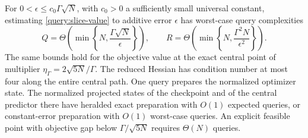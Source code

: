 \begin{theorem}\label{query:precision}
For $0<\epsilon\leq c_0\Gamma\sqrt N$, with $c_0>0$ a sufficiently
small universal constant, estimating \eqref{query:slice-value} to additive
error $\epsilon$ has worst-case query complexities
\begin{equation}\label{query:precision-law}
 Q=\Theta\!\left(\min\left\{N,\frac{\Gamma\sqrt N}{\epsilon}\right\}\right),
 \qquad
 R=\Theta\!\left(\min\left\{N,\frac{\Gamma^2N}{\epsilon^2}\right\}\right).
\end{equation}
The same bounds hold for the objective value at the exact central point
of multiplier $\eta_\Gamma=2\sqrt{5N}/\Gamma$. The reduced Hessian has
condition number at most four along the entire central path. One query
prepares the normalized optimizer state. The normalized projected states
of the checkpoint and of the central predictor there have heralded exact
preparation with $O(1)$ expected queries, or constant-error preparation
with $O(1)$ worst-case queries. An explicit feasible point with objective
gap below $\Gamma/\sqrt{5N}$ requires $\Theta(N)$
queries.
\end{theorem}
